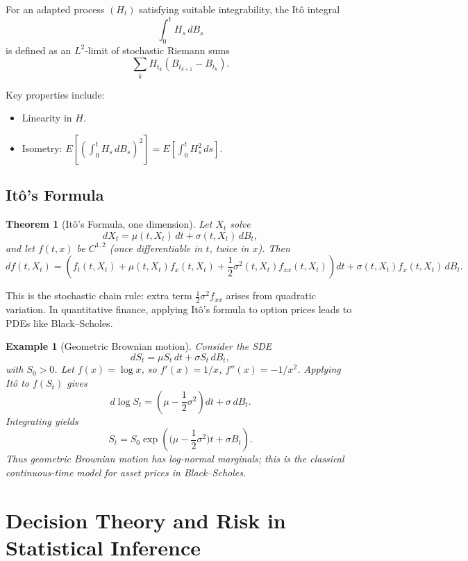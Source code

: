 \documentclass[11pt,a4paper]{article}
\newtheorem{theorem}{Theorem}[section]
\newtheorem{example}{Example}[section]
\numberwithin{equation}{section}
\begin{document}
For an adapted process $(H_t)$ satisfying suitable integrability, the It\^o integral
\[
\int_0^t H_s\,dB_s
\]
is defined as an $L^2$-limit of stochastic Riemann sums
\[
\sum_{k} H_{t_k} (B_{t_{k+1}} - B_{t_k}).
\]

Key properties include:
\begin{itemize}
    \item Linearity in $H$.
    \item Isometry: $E\left[ \left( \int_0^t H_s\,dB_s \right)^2 \right] = E\left[ \int_0^t H_s^2\,ds \right]$.
\end{itemize}

\subsection{It\^o's Formula}

\begin{theorem}[It\^o's Formula, one dimension]
Let $X_t$ solve
\[
dX_t = \mu(t,X_t)\,dt + \sigma(t,X_t)\,dB_t,
\]
and let $f(t,x)$ be $C^{1,2}$ (once differentiable in $t$, twice in $x$). 
Then
\[
df(t,X_t)
= \left( f_t(t,X_t) + \mu(t,X_t) f_x(t,X_t)
+ \frac{1}{2}\sigma^2(t,X_t) f_{xx}(t,X_t) \right) dt
+ \sigma(t,X_t) f_x(t,X_t)\,dB_t.
\]
\end{theorem}

This is the stochastic chain rule: extra term $\tfrac{1}{2}\sigma^2 f_{xx}$ arises from quadratic variation. 
In quantitative finance, applying It\^o's formula to option prices leads to PDEs like Black--Scholes.

\begin{example}[Geometric Brownian motion]
Consider the SDE
\[
dS_t = \mu S_t\,dt + \sigma S_t\,dB_t,
\]
with $S_0>0$. 
Let $f(x) = \log x$, so $f'(x) = 1/x$, $f''(x) = -1/x^2$. 
Applying It\^o to $f(S_t)$ gives
\[
d\log S_t
= \left(\mu - \frac{1}{2}\sigma^2\right) dt + \sigma\,dB_t.
\]
Integrating yields
\[
S_t = S_0\exp\left(\Big(\mu-\frac{1}{2}\sigma^2\Big)t + \sigma B_t\right).
\]
Thus geometric Brownian motion has log-normal marginals; this is the classical continuous-time model for asset prices in Black--Scholes.

\end{example}

\newpage

\section{Decision Theory and Risk in Statistical Inference}
\label{sec:decision}
\end{document}
